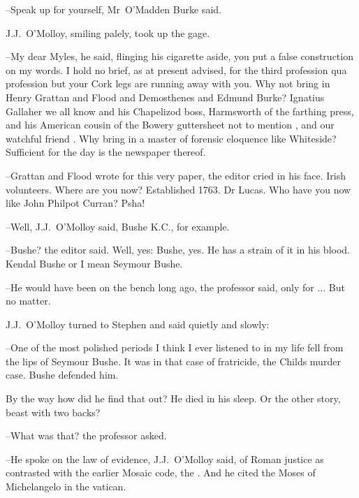 --Speak up for yourself,
Mr~O'Madden Burke said.



J.J.~O'Molloy,
smiling palely,
took up the gage.

--My dear Myles,
he said,
flinging his cigarette aside,
you put a false construction on my words.
I hold no brief,
as at present advised,
for the third profession qua profession
but your Cork legs are running away with you.
Why not bring in Henry Grattan and Flood and Demosthenes and Edmund Burke?
Ignatius Gallaher we all know
and his Chapelizod boss, Harmsworth of the farthing press,
and his American cousin of the Bowery guttersheet
not to mention ,
and our watchful friend .
Why bring in a master of forensic eloquence like Whiteside?
Sufficient for the day is the newspaper thereof.



--Grattan and Flood wrote for this very paper,
the editor cried in his face.
Irish volunteers.
Where are you now?
Established 1763.
Dr Lucas.
Who have you now like John Philpot Curran?
Psha!

--Well,
J.J.~O'Molloy said,
Bushe K.C., for example.

--Bushe?
the editor said.
Well, yes:
Bushe, yes.
He has a strain of it in his blood.
Kendal Bushe or I mean Seymour Bushe.

--He would have been on the bench long ago,
the professor said,
only for ...
But no matter.

J.J.~O'Molloy turned to Stephen
and said quietly and slowly:

--One of the most polished periods
I think I ever listened to in my life
fell from the lips of Seymour Bushe.
It was in that case of fratricide,
the Childs murder case.
Bushe defended him.


By the way how did he find that out?
He died in his sleep.
Or the other story,
beast with two backs?

--What was that?
the professor asked.



--He spoke on the law of evidence,
J.J.~O'Molloy said,
of Roman justice
as contrasted with the earlier Mosaic code,
the .
And he cited the Moses of Michelangelo in the vatican.

